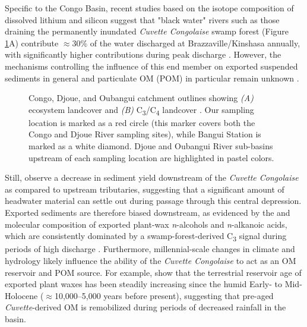 Specific to the Congo Basin, recent studies based on the isotope composition of dissolved lithium and silicon suggest that "black water" rivers such as those draining the permanently inundated \textit{Cuvette Congolaise} swamp forest (Figure \ref{Ch5Fig:1}A) contribute $\approx 30$\% of the water discharged at Brazzaville/Kinshasa annually, with significantly higher contributions during peak discharge \citep{Cardinal:2010ir,Henchiri:2016jh}. However, the mechanisms controlling the influence of this end member on exported suspended sediments in general and particulate OM (POM) in particular remain unknown \citep{Spencer:2016ho}.

\begin{figure}[ht]
	\caption[Congo catchment map showing landcover and \%C\textsubscript{3} vs. \%C\textsubscript{4} vegatation]{Congo, Djoue, and Oubangui catchment outlines showing \textit{(A)} ecosystem landcover \citep{Mayaux:2004uw} and \textit{(B)} C\textsubscript{3}/C\textsubscript{4} landcover \citep{Still:2010wh}. Our sampling location is marked as a red circle (this marker covers both the Congo and Djoue River sampling sites), while Bangui Station \citep{Bouillon:2012cw,Bouillon:2014ko} is marked as a white diamond. Djoue and Oubangui River sub-basins upstream of each sampling location are highlighted in pastel colors.}
	\label{Ch5Fig:1} 
\end{figure}

Still, \citet{Laraque:2009fz} observe a decrease in sediment yield downstream of the \textit{Cuvette Congolaise} as compared to upstream tributaries, suggesting that a significant amount of headwater material can settle out during passage through this central depression. Exported sediments are therefore biased downstream, as evidenced by the  and molecular composition of exported plant-wax \textit{n}-alcohols and \textit{n}-alkanoic acids, which are consistently dominated by a swamp-forest-derived C\textsubscript{3} signal during periods of high discharge \citep{Hemingway:2016bq}. Furthermore, millennial-scale changes in climate and hydrology likely influence the ability of the \textit{Cuvette Congolaise} to act as an OM reservoir and POM source. For example, \citet{Schefuss:2016cp} show that the terrestrial reservoir age of exported plant waxes has been steadily increasing since the humid Early- to Mid-Holocene ($\approx$10,000--5,000 years before present), suggesting that pre-aged \textit{Cuvette}-derived OM is remobilized during periods of decreased rainfall in the basin.

